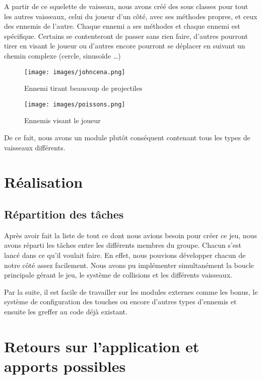 \documentclass[a4paper, 12pt]{report}
\begin{document}
\noindent A partir de ce squelette de vaisseau, nous avons créé des sous classes pour
tout les autres vaisseaux, celui du joueur d'un côté, avec ses méthodes
propres, et ceux des ennemis de l'autre. Chaque ennemi a ses méthodes et chaque
ennemi est spécifique. Certains se contenteront de passer sans rien faire,
d'autres pourront tirer en visant le joueur ou d'autres encore pourront se
déplacer en suivant un chemin complexe (cercle, sinusoïde \ldots)\newline

\begin{figure}[!ht]
	\centering
	\begin{minipage}[t]{.49\linewidth}
		\centering
		\texttt{[image: images/johncena.png]}
		\caption{Ennemi tirant beaucoup de projectiles}
	\end{minipage}
	\begin{minipage}[t]{.49\linewidth}
		\centering
		\texttt{[image: images/poissons.png]}
		\caption{Ennemis visant le joueur}
	\end{minipage}
\end{figure}

\noindent De ce fait, nous avons un module plutôt conséquent contenant tous les types
de vaisseaux différents.

\chapter{Réalisation}
\section{Répartition des tâches}

Après avoir fait la liste de tout ce dont nous avions besoin pour créer ce jeu,
nous avons réparti les tâches entre les différents membres du groupe. Chacun
s'est lancé dans ce qu'il voulait faire. En effet, nous pouvions développer
chacun de notre côté assez facilement. Nous avons pu implémenter simultanément
la boucle principale gérant le jeu, le système de collisions et les différents
vaisseaux.\newline

\noindent Par la suite, il est facile de travailler sur les modules externes
comme les bonus, le système de configuration des touches ou encore d'autres
types d'ennemis et ensuite les greffer au code déjà existant.

\chapter{Retours sur l'application et apports possibles}
\end{document}
